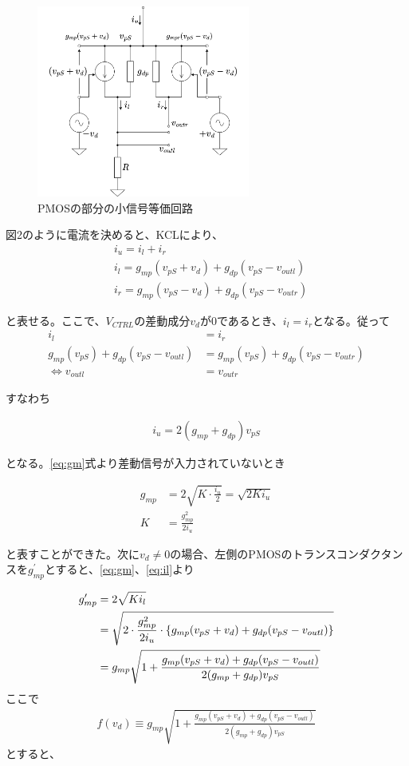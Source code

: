 \documentclass[twocolumn]{jsarticle}
\begin{document}
\begin{figure}[h]
    \includegraphics*[width=70mm]{figures/FoldedGilbertVctrlEquivalentCircuit.png}
    \caption{PMOSの部分の小信号等価回路}
\end{figure}

図2のように電流を決めると、KCLにより、
\begin{align}
    &i_{u}=i_{l}+i_{r}\label{eq:iu}\\
    &i_{l}=g_{mp}(v_{pS}+v_{d})+g_{dp}(v_{pS}-v_{outl})\label{eq:il}\\
    &i_{r}=g_{mp}(v_{pS}-v_{d})+g_{dp}(v_{pS}-v_{outr})
\end{align}

と表せる。ここで、$V_{CTRL}$の差動成分$v_{d}$が$0$であるとき、$i_{l}=i_{r}$となる。従って
\begin{align*}
    i_{l}&=i_{r}\\
    g_{mp}(v_{pS})+g_{dp}(v_{pS}-v_{outl})&=g_{mp}(v_{pS})+g_{dp}(v_{pS}-v_{outr})\\
    \iff v_{outl}&=v_{outr}
\end{align*}

すなわち

\begin{align}
    i_{u}=2(g_{mp}+g_{dp})v_{pS}
\end{align}

となる。\eqref{eq:gm}式より差動信号が入力されていないとき

\begin{align}
    g_{mp}&=2\sqrt{K\cdot\frac{i_{u}}{2}}=\sqrt{2Ki_{u}}\\
    K&=\frac{g_{mp}^{2}}{2i_{u}}
\end{align}

と表すことができた。次に$v_{d}\ne0$の場合、左側のPMOSのトランスコンダクタンスを$g_{mp}^{\prime}$とすると、\eqref{eq:gm}、\eqref{eq:il}より

\begin{align}
    g_{mp}^{\prime}&=2\sqrt{Ki_{l}}\notag\\
    &=\sqrt{2\cdot\frac{g_{mp}^{2}}{2i_{u}}\cdot \left\{g_{mp}(v_{pS}+v_{d})+g_{dp}(v_{pS}-v_{outl}) \right\}}\notag\\
    &=g_{mp}\sqrt{1+\frac{g_{mp}(v_{pS}+v_{d})+g_{dp}(v_{pS}-v_{outl})}{2(g_{mp}+g_{dp})v_{pS}}}\notag
\end{align}
ここで
\begin{align}
    f(v_{d})\equiv g_{mp}\sqrt{1+\frac{g_{mp}(v_{pS}+v_{d})+g_{dp}(v_{pS}-v_{outl})}{2(g_{mp}+g_{dp})v_{pS}}}
\end{align}
とすると、
\end{document}
